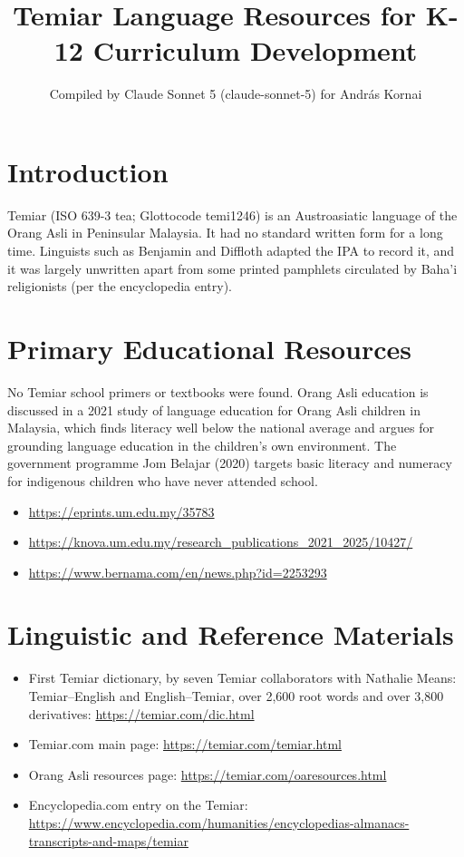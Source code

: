 \documentclass[12pt]{article}
\title{Temiar Language Resources for K-12 Curriculum Development}
\author{Compiled by Claude Sonnet 5 (claude-sonnet-5) for Andr\'as Kornai}
\date{}
\begin{document}
\maketitle

\section{Introduction}
Temiar (ISO 639-3 tea; Glottocode temi1246) is an Austroasiatic language of the Orang Asli in Peninsular Malaysia. It had no standard written form for a long time. Linguists such as Benjamin and Diffloth adapted the IPA to record it, and it was largely unwritten apart from some printed pamphlets circulated by Baha'i religionists (per the encyclopedia entry).

\section{Primary Educational Resources}
No Temiar school primers or textbooks were found. Orang Asli education is discussed in a 2021 study of language education for Orang Asli children in Malaysia, which finds literacy well below the national average and argues for grounding language education in the children's own environment. The government programme Jom Belajar (2020) targets basic literacy and numeracy for indigenous children who have never attended school.
\begin{itemize}
\item \url{https://eprints.um.edu.my/35783}
\item \url{https://knova.um.edu.my/research_publications_2021_2025/10427/}
\item \url{https://www.bernama.com/en/news.php?id=2253293}
\end{itemize}

\section{Linguistic and Reference Materials}
\begin{itemize}
\item First Temiar dictionary, by seven Temiar collaborators with Nathalie Means: Temiar--English and English--Temiar, over 2,600 root words and over 3,800 derivatives: \url{https://temiar.com/dic.html}
\item Temiar.com main page: \url{https://temiar.com/temiar.html}
\item Orang Asli resources page: \url{https://temiar.com/oaresources.html}
\item Encyclopedia.com entry on the Temiar: \url{https://www.encyclopedia.com/humanities/encyclopedias-almanacs-transcripts-and-maps/temiar}
\end{itemize}
\end{document}
